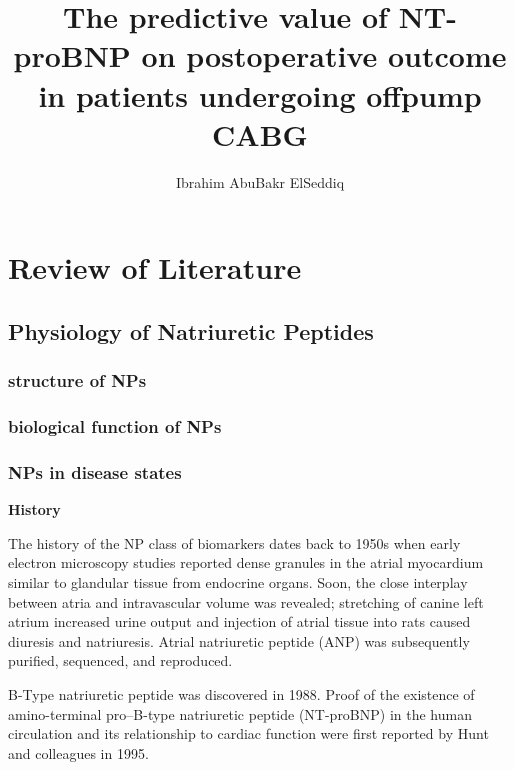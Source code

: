 \documentclass[14pt,a4paper,onecolumn]{extarticle}
\author{Ibrahim AbuBakr ElSeddiq}
\title{The predictive value of NT-proBNP on postoperative outcome in patients undergoing offpump CABG}
\begin{document}
\maketitle

\clearpage
\section{Review of Literature}
\subsection{Physiology of Natriuretic Peptides}
\subsubsection{structure of NPs}
\subsubsection{biological function of NPs}
\subsubsection{NPs in disease states}

\textbf{History}


The history of the NP class of biomarkers dates back to 1950s when early electron microscopy studies reported dense granules in the atrial myocardium similar to glandular tissue from endocrine organs. Soon, the close interplay between atria and intravascular volume was revealed; stretching of canine left atrium increased urine output and injection of atrial tissue into rats caused diuresis and natriuresis. Atrial natriuretic peptide (ANP) was subsequently purified, sequenced, and reproduced. \citep{Gaggin2014} %

B-Type natriuretic peptide was discovered in 1988. Proof of the existence of amino-terminal pro–B-type natriuretic peptide (NT-proBNP) in the human circulation and its relationship to cardiac function were first reported by Hunt and colleagues in 1995. \citep{Richards2018} %
\end{document}

